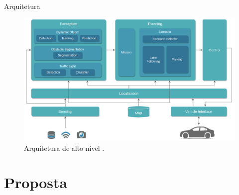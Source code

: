 \documentclass{if-beamer}
\begin{document}
\begin{frame}{Arquitetura}
	
	\begin{figure}
		\centering
		\includegraphics[width=0.8\linewidth]{img/HL_architecture}
		\caption{Arquitetura de alto nível \cite{autowareArchitecture}.}
		\label{fig:hlarchitecture}
	\end{figure}
	
\end{frame}

\section{Proposta}
\end{document}
